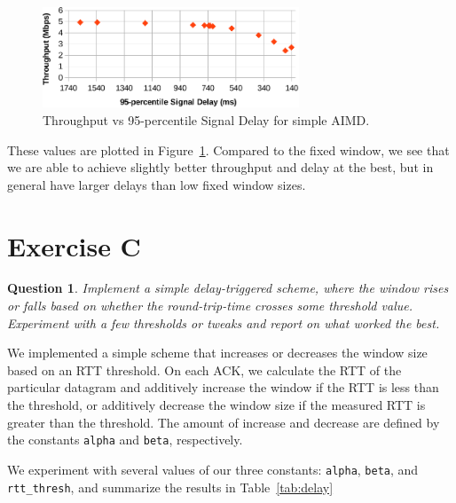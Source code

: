 \documentclass[twoside]{article}
\newtheorem{question}[theorem]{Question}
\begin{document}
\begin{figure}[h]
  \centering
  \includegraphics[height=3cm]{./img/exb_fig.pdf}
  \caption{Throughput vs 95-percentile Signal Delay for simple AIMD.}
  \label{fig:exb}
\end{figure}

These values are plotted in Figure~\ref{fig:exb}. Compared to the fixed window,
we see that we are able to achieve slightly better throughput and delay at
the best, but in general have larger delays than low fixed window sizes.


\vfill
\pagebreak

\section*{Exercise C}
\begin{question}
  Implement a simple delay-triggered scheme, where the window rises or falls
  based on whether the round-trip-time crosses some threshold value. Experiment
  with a few thresholds or tweaks and report on what worked the best.
\end{question}

We implemented a simple scheme that increases or decreases the window size
based on an RTT threshold. On each ACK, we calculate the RTT of the particular
datagram and additively increase the window if the RTT is less than the threshold,
or additively decrease the window size if the measured RTT is
greater than the threshold.
The amount of increase and decrease are defined by the constants
\texttt{alpha} and \texttt{beta}, respectively.

We experiment with several values of our three constants: \texttt{alpha},
\texttt{beta}, and \texttt{rtt\_thresh}, and summarize the results in
Table~\ref{tab:delay}
\end{document}
